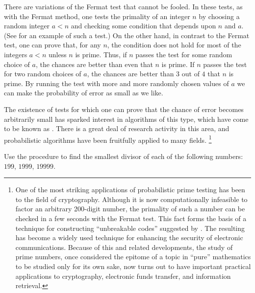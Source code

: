 There are variations of the Fermat test that cannot be fooled.
In these tests, as with the Fermat method, one tests the primality of an integer \( n \) by choosing a random integer \( a < n \) and checking some condition that depends upon \( n \) and \( a \).
(See  for an example of such a test.)
On the other hand, in contrast to the Fermat test, one can prove that, for any \( n \), the condition does not hold for most of the integers \( a < n \) unless \( n \) is prime.
Thus, if \( n \) passes the test for some random choice of \( a \), the chances are better than even that \( n \) is prime.
If \( n \) passes the test for two random choices of \( a \), the chances are better than \( 3 \) out of \( 4 \) that \( n \) is prime.
By running the test with more and more randomly chosen values of \( a \) we can make the probability of error as small as we like.

The existence of tests for which one can prove that the chance of error becomes arbitrarily small has sparked interest in algorithms of this type, which have come to be known as .
There is a great deal of research activity in this area, and probabilistic algorithms have been fruitfully applied to many fields.%
\footnote{
	One of the most striking applications of probabilistic prime testing has been to the field of cryptography.
	Although it is now computationally infeasible to factor an arbitrary 200-digit number, the primality of such a number can be checked in a few seconds with the Fermat test.
	This fact forms the basis of a technique for constructing “unbreakable codes” suggested by .
	The resulting  has become a widely used technique for enhancing the security of electronic communications.
	Because of this and related developments, the study of prime numbers, once considered the epitome of a topic in “pure” mathematics to be studied only for its own sake, now turns out to have important practical applications to cryptography, electronic funds transfer, and information retrieval.
}



\begin{exercise}
	\label{Exercise 1.21}
	Use the  procedure to find the smallest divisor of each of the following numbers:
	\( 199 \), \( 1999 \), \( 19999 \).
\end{exercise}



